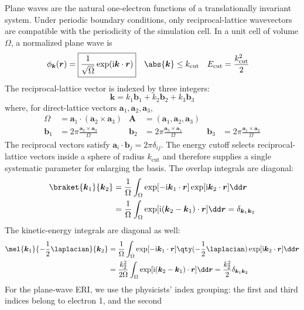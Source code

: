 \documentclass[11pt,a4paper,titlepage]{article}
\numberwithin{equation}{section}
\newcommand{\ba}{\boldsymbol{a}}
\newcommand{\bb}{\boldsymbol{b}}
\newcommand{\bk}{\boldsymbol{k}}
\newcommand{\br}{\boldsymbol{r}}
\newcommand{\bA}{\boldsymbol{A}}
\newcommand{\ii}{\mathrm{i}}
\begin{document}
Plane waves are the natural one-electron functions of a translationally
invariant system. Under periodic boundary conditions, only reciprocal-lattice
wavevectors are compatible with the periodicity of the simulation cell.
In a unit cell of volume $\Omega$, a normalized plane wave is
\begin{align}
  \phi_{\bk}(\br)&=\boxed{\frac{1}{\sqrt{\Omega}}\exp(\ii\bk\cdot\br)}
  &
  \abs{\bk}&\leq k_\text{cut}
  &
  E_\text{cut}&=\frac{k_\text{cut}^2}{2}
\end{align}
The reciprocal-lattice vector is indexed by three integers:
\begin{equation}
  \bk=k_1\bb_1+k_2\bb_2+k_3\bb_3
\end{equation}
where, for direct-lattice vectors $\ba_1,\ba_2,\ba_3$,
\begin{align}
  \Omega&=\ba_1\cdot(\ba_2\times\ba_3)
  &\bA&=(\ba_1,\ba_2,\ba_3)\\
  \bb_1&=2\pi\frac{\ba_2\times\ba_3}{\Omega}
  &\bb_2&=2\pi\frac{\ba_3\times\ba_1}{\Omega}
  &\bb_3&=2\pi\frac{\ba_1\times\ba_2}{\Omega}
\end{align}
The reciprocal vectors satisfy $\ba_i\cdot\bb_j=2\pi\delta_{ij}$. The energy
cutoff selects reciprocal-lattice vectors inside a sphere of radius
$k_\text{cut}$ and therefore supplies a single systematic parameter for
enlarging the basis.
The overlap integrals are diagonal:
\begin{equation}
\begin{split}
  \braket{\bk_1}{\bk_2}
  &=\frac{1}{\Omega}\int_\Omega
    \exp[-\ii\bk_1\cdot\br]\exp[\ii\bk_2\cdot\br]\dd\br\\
  &=\frac{1}{\Omega}\int_\Omega
    \exp[\ii(\bk_2-\bk_1)\cdot\br]\dd\br
  =\delta_{\bk_1\bk_2}
\end{split}
\end{equation}
The kinetic-energy integrals are diagonal as well:
\begin{equation}
\begin{split}
  \mel{\bk_1}{-\frac12\laplacian}{\bk_2}
  &=\frac{1}{\Omega}\int_\Omega
    \exp[-\ii\bk_1\cdot\br]
    \qty(-\frac12\laplacian)\exp[\ii\bk_2\cdot\br]\dd\br\\
  &=\frac{k_2^2}{2\Omega}\int_\Omega
    \exp[\ii(\bk_2-\bk_1)\cdot\br]\dd\br
  =\frac{k_2^2}{2}\delta_{\bk_1\bk_2}
\end{split}
\end{equation}
For the plane-wave ERI, we use the physicists' index grouping:
the first and third indices belong to electron 1, and the second
\end{document}

